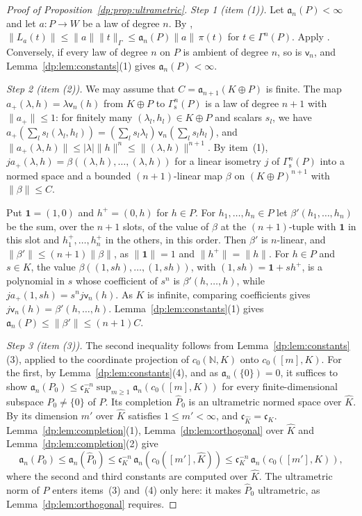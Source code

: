 \documentclass[11pt]{amsart}
\theoremstyle{definition}
\theoremstyle{remark}
\numberwithin{equation}{section}
\newcommand{\N}{\mathbb N}
\newcommand{\abs}[1]{\lvert #1\rvert}
\newcommand{\norm}[1]{\lVert #1\rVert}
\newcommand{\Kh}{\widehat K}
\theoremstyle{plain}
\theoremstyle{definition}
\theoremstyle{plain}
\begin{document}
\begin{proof}[Proof of Proposition~\ref{dp:prop:ultrametric}]
\emph{Step 1 (item (1)).} Let $\mathfrak a_n(P)<\infty$ and let $a\colon P\to W$ be a law of degree $n$. By \cite[Lemma~Q.1(1)]{I}, $\norm{L_a(t)}\le\norm a\norm t_\Gamma\le\mathfrak a_n(P)\norm a\,\pi(t)$ for $t\in\Gamma^n(P)$. Apply \cite[Lemma~Q.1(4)]{I}. Conversely, if every law of degree $n$ on $P$ is ambient of degree $n$, so is $\mathsf v_n$, and Lemma~\ref{dp:lem:constants}(1) gives $\mathfrak a_n(P)<\infty$.

\emph{Step 2 (item (2)).} We may assume that $C=\mathfrak a_{n+1}(K\oplus P)$ is finite. The map $a_+(\lambda,h)=\lambda\mathsf v_n(h)$ from $K\oplus P$ to $\Gamma^n_{\mathrm s}(P)$ is a law of degree $n+1$ with $\norm{a_+}\le1$: for finitely many $(\lambda_l,h_l)\in K\oplus P$ and scalars $s_l$, we have $a_+(\sum_ls_l(\lambda_l,h_l))=(\sum_ls_l\lambda_l)\,\mathsf v_n(\sum_ls_lh_l)$, and $\norm{a_+(\lambda,h)}\le\abs\lambda\norm h^n\le\norm{(\lambda,h)}^{n+1}$. By item~(1), $ja_+(\lambda,h)=\beta((\lambda,h),\dots,(\lambda,h))$ for a linear isometry $j$ of $\Gamma^n_{\mathrm s}(P)$ into a normed space and a bounded $(n+1)$\nobreakdash-linear map $\beta$ on $(K\oplus P)^{n+1}$ with $\norm\beta\le C$.

Put $\mathbf 1=(1,0)$ and $h^+=(0,h)$ for $h\in P$. For $h_1,\dots,h_n\in P$ let $\beta'(h_1,\dots,h_n)$ be the sum, over the $n+1$ slots, of the value of $\beta$ at the $(n+1)$\nobreakdash-tuple with $\mathbf 1$ in this slot and $h_1^+,\dots,h_n^+$ in the others, in this order. Then $\beta'$ is $n$\nobreakdash-linear, and $\norm{\beta'}\le(n+1)\norm\beta$, as $\norm{\mathbf 1}=1$ and $\norm{h^+}=\norm h$. For $h\in P$ and $s\in K$, the value $\beta((1,sh),\dots,(1,sh))$, with $(1,sh)=\mathbf 1+sh^+$, is a polynomial in $s$ whose coefficient of $s^n$ is $\beta'(h,\dots,h)$, while $ja_+(1,sh)=s^nj\mathsf v_n(h)$. As $K$ is infinite, comparing coefficients gives $j\mathsf v_n(h)=\beta'(h,\dots,h)$. Lemma~\ref{dp:lem:constants}(1) gives $\mathfrak a_n(P)\le\norm{\beta'}\le(n+1)C$.

\emph{Step 3 (item (3)).} The second inequality follows from Lemma~\ref{dp:lem:constants}(3), applied to the coordinate projection of $c_0(\N,K)$ onto $c_0([m],K)$. For the first, by Lemma~\ref{dp:lem:constants}(4), and as $\mathfrak a_n(\{0\})=0$, it suffices to show $\mathfrak a_n(P_0)\le\mathfrak c_K^{-n}\sup_{m\ge1}\mathfrak a_n(c_0([m],K))$ for every finite-dimensional subspace $P_0\ne\{0\}$ of $P$. Its completion $\widehat P_0$ is an ultrametric normed space over $\Kh$. By \cite[Lemma~Q.13(2)]{I} its dimension $m'$ over $\Kh$ satisfies $1\le m'<\infty$, and $\mathfrak c_{\Kh}=\mathfrak c_K$. Lemma~\ref{dp:lem:completion}(1), Lemma~\ref{dp:lem:orthogonal} over $\Kh$ and Lemma~\ref{dp:lem:completion}(2) give
\[
 \mathfrak a_n(P_0)\le\mathfrak a_n(\widehat P_0)\le\mathfrak c_K^{-n}\,\mathfrak a_n(c_0([m'],\Kh))
 \le\mathfrak c_K^{-n}\,\mathfrak a_n(c_0([m'],K)),
\]
where the second and third constants are computed over $\Kh$. The ultrametric norm of $P$ enters items~(3) and~(4) only here: it makes $\widehat P_0$ ultrametric, as Lemma~\ref{dp:lem:orthogonal} requires.


\end{proof}
\end{document}
